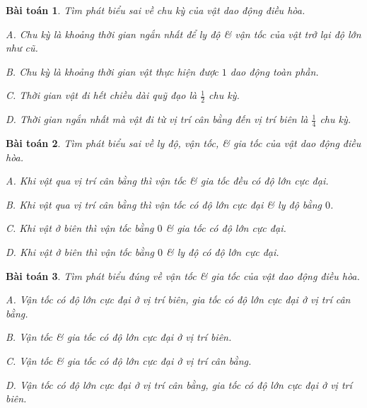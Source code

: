 \documentclass{article}
\numberwithin{equation}{section}
\newtheorem{baitoan}{Bài toán}[section]
\begin{document}
\begin{baitoan}
	Tìm phát biểu sai về chu kỳ của vật dao động điều hòa.
	\begin{enumerate*}
		\item[{\rm\sf A.}] Chu kỳ là khoảng thời gian ngắn nhất để ly độ \& vận tốc của vật trở lại độ lớn như cũ.
		\item[{\rm\sf B.}] Chu kỳ là khoảng thời gian vật thực hiện được $1$ dao động toàn phần.
		\item[{\rm\sf C.}] Thời gian vật đi hết chiều dài quỹ đạo là $\frac{1}{2}$ chu kỳ.
		\item[{\rm\sf D.}] Thời gian ngắn nhất mà vật đi từ vị trí cân bằng đến vị trí biên là $\frac{1}{4}$ chu kỳ.
	\end{enumerate*}
\end{baitoan}

\begin{baitoan}
	Tìm phát biểu sai về ly độ, vận tốc, \& gia tốc của vật dao động điều hòa.
	\begin{enumerate*}
		\item[{\rm\sf A.}] Khi vật qua vị trí cân bằng thì vận tốc \& gia tốc đều có độ lớn cực đại.
		\item[{\rm\sf B.}] Khi vật qua vị trí cân bằng thì vận tốc có độ lớn cực đại \& ly độ bằng $0$.
		\item[{\rm\sf C.}] Khi vật ở biên thì vận tốc bằng $0$ \& gia tốc có độ lớn cực đại.
		\item[{\rm\sf D.}] Khi vật ở biên thì vận tốc bằng $0$ \& ly độ có độ lớn cực đại.
	\end{enumerate*}
\end{baitoan}

\begin{baitoan}
	Tìm phát biểu đúng về vận tốc \& gia tốc của vật dao động điều hòa.
	\begin{enumerate*}
		\item[{\rm\sf A.}] Vận tốc có độ lớn cực đại ở vị trí biên, gia tốc có độ lớn cực đại ở vị trí cân bằng.
		\item[{\rm\sf B.}] Vận tốc \& gia tốc có độ lớn cực đại ở vị trí biên.
		\item[{\rm\sf C.}] Vận tốc \& gia tốc có độ lớn cực đại ở vị trí cân bằng.
		\item[{\rm\sf D.}] Vận tốc có độ lớn cực đại ở vị trí cân bằng, gia tốc có độ lớn cực đại ở vị trí biên.
	\end{enumerate*}
\end{baitoan}
\end{document}
